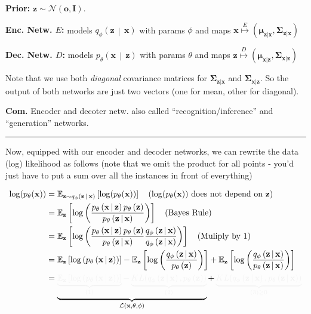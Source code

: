 \documentclass[a2paper,8pt]{extarticle}
\makeatletter
\def\mc#1#{\@mc{#1}}
\def\@mc#1#2#3{%
  \protect\leavevmode
  \begingroup
    \color#1{#2}#3%
  \endgroup
}
\newcommand{\mcr}[1]{\mc{lighttext}{#1}}
\newcommand{\mcg}[1]{\mc{lighttext}{#1}}
\newcommand{\mcr}[1]{\mc{red}{#1}}
\newcommand{\mcg}[1]{\mc{green}{#1}}
\newcommand{\cL}{\mathcal{L}}
\newcommand{\cN}{\mathcal{N}}
\newcommand{\Dist}[2]{#1\left( #2 \right)}
\newcommand{\cDist}[3]{#1\left( #2 \,\middle|\, #3 \right)}
\newcommand{\Exp}[2][]{{\mathbb{E}_{#1}}\left[ #2
\right]}
\newcommand{\mat}[1]{\mathbf{#1}}
\renewcommand{\vec}[1]{\mathbf{#1}}
\newcommand{\vo}{\vec{o}}
\newcommand{\vx}{\vec{x}}
\newcommand{\vz}{\vec{z}}
\newcommand{\vmu}{\boldsymbol{\mu}}
\newcommand{\MI}{\mat{I}}
\newcommand{\MSigma}{\mat{\Sigma}}
\newcommand{\Com}{\textbf{Com.} }
\newcommand{\sep}{\vspace{0pt}\noindent\hrule\vspace{0pt}}
\newcommand{\sep}{\vspace{5pt}\noindent\hrule\vspace{5pt}}
\makeatother
\begin{document}
\begin{landscape}
\begin{multicols*}{7}
\textbf{Prior:} $\vz\sim\cN(\vo,\MI)$.

\textbf{Enc. Netw. $E$:} models $\cDist{q_\phi}{\vz}{\vx}$ with params
$\phi$ and maps $\vx\stackrel{E}{\mapsto}(\vmu_{\vz|\vx},\MSigma_{\vz|\vx})$

\textbf{Dec. Netw. $D$:} models $\cDist{p_\theta}{\vx}{\vz}$ with params
$\theta$ and maps $\vz\stackrel{D}{\mapsto}(\vmu_{\vx|\vz},\MSigma_{\vx|\vz})$

Note that we use both \emph{diagonal} covariance matrices for
$\MSigma_{\vz|\vx}$ and $\MSigma_{\vx|\vz}$. So the output of both networks are
just two vectors (one for mean, other for diagonal).

\Com Encoder and decoter netw. also called ``recognition/inference'' and
``generation'' networks.

\sep

Now, equipped with our encoder and decoder networks, we can rewrite the data
(log) likelihood as follows (note that we omit the product for all points -
you'd just have to put a sum over all the instances in front of everything)

\begin{gather*}
\begin{align*}
\log(p_\theta(\vx))
&=\Exp[\vz\sim \cDist{q_\phi}{\vz}{\vx}]{\log(p_\theta(\vx))}
\quad (\log(p_\theta(\vx))\text{ does not depend on $\vz$})
\\
&=
\Exp[\vz]{
\log\left(
\frac{
\cDist{p_\theta}{\vx}{\vz}\Dist{p_\theta}{\vz}
}{
\cDist{p_\theta}{\vz}{\vx}
}
\right)
}
\quad(\text{Bayes Rule})
\\
&=
\Exp[\vz]{
\log\left(
\frac{
\cDist{p_\theta}{\vx}{\vz}\Dist{p_\theta}{\vz}
}{
\cDist{p_\theta}{\vz}{\vx}
}
\frac{\cDist{q_\phi}{\vz}{\vx}}{\cDist{q_\phi}{\vz}{\vx}}
\right)
}
\quad(\text{Muliply by 1})
\\
&=
\Exp[\vz]{\log\left(\cDist{p_\theta}{\vx}{\vz}\right)}
-
\Exp[\vz]{\log\left(
\frac{
\cDist{q_\phi}{\vz}{\vx}
}{
\Dist{p_\theta}{\vz}
}
\right)}
+
\Exp[\vz]{\log\left(
\frac{
\cDist{q_\phi}{\vz}{\vx}
}{
\cDist{p_\theta}{\vz}{\vx}
}
\right)}
\\
&=
\underbrace{
\mcg{\underbrace{\Exp[\vz]{\log\left(\cDist{p_\theta}{\vx}{\vz}\right)}}_{(1)}
-
\underbrace{KL(\cDist{q_\phi}{\vz}{\vx},\Dist{p_\theta}{\vz})}_{(2)}}
}_{\cL(\vx,\theta,\phi)}
+
\mcr{
\underbrace{KL(\cDist{q_\phi}{\vz}{\vx},\cDist{p_\theta}{\vz}{\vx})}_{(3)\geq 0}
}
\end{align*}
\end{gather*}


\end{multicols*}
\end{landscape}
\end{document}
